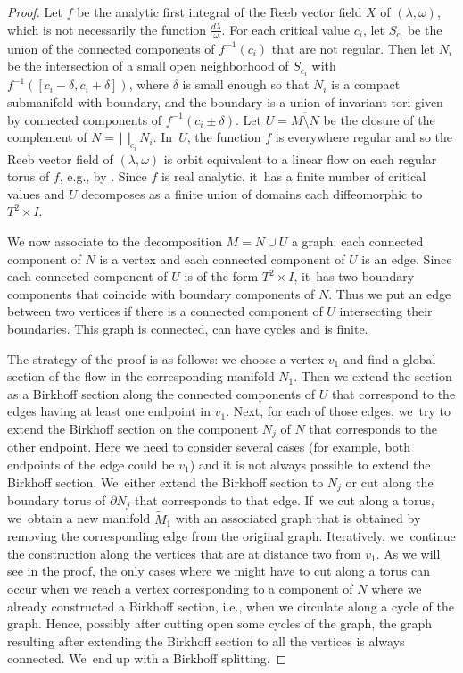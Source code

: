 \documentclass[11pt]{article}
\newcommand{\ie}{i.e.,\xspace}
\newcommand{\eg}{e.g.,\xspace}
\theoremstyle{definition}
\begin{document}
\begin{proof}
Let $f$ be the analytic first integral of the Reeb vector field $X$ of $(\lambda, \omega)$, which is not necessarily the function $\frac{d\lambda}{\omega}$. For each critical value $c_i$, let $S_{c_i}$ be the union of the connected components of $f^{-1}(c_i)$ that are not regular. Then let $N_i$ be the intersection of a small open neighborhood of $S_{c_i}$ with $f^{-1}([c_i-\delta,c_i+\delta])$, where $\delta$ is small enough so that $N_i$ is a compact submanifold with boundary, and the boundary is a union of invariant tori given by connected components of $f^{-1}(c_i \pm \delta)$. Let $U=\overline{M\setminus N}$ be the closure of the complement of $N=\bigsqcup_{c_i}N_i$. In~$U$, the function $f$ is everywhere regular and so the Reeb vector field of $(\lambda,\omega)$ is orbit equivalent to a linear flow on each regular torus of $f$, \eg by \cite[Th.\,3.3]{CV1}. Since $f$ is real analytic, it~has a finite number of critical values and $U$ decomposes as a finite union of domains each diffeomorphic to $T^2\times I$.

We now associate to the decomposition $M=N\cup U$ a graph: each connected component of $N$ is a vertex and each connected component of $U$ is an edge. Since each connected component of $U$ is of the form $T^2\times I$, it~has two boundary components that coincide with boundary components of $N$. Thus we put an edge between two vertices if there is a connected component of $U$ intersecting their boundaries. This graph is connected, can have cycles and is finite.

The strategy of the proof is as follows: we choose a vertex $v_1$ and find a global section of the flow in the corresponding manifold $N_1$. Then we extend the section as a Birkhoff section along the connected components of $U$ that correspond to the edges having at least one endpoint in $v_1$. Next, for each of those edges, we~try to extend the Birkhoff section on the component $N_j$ of $N$ that corresponds to the other endpoint. Here we need to consider several cases (for example, both endpoints of the edge could be $v_1$) and it is not always possible to extend the Birkhoff section. We~either extend the Birkhoff section to $N_j$ or cut along the boundary torus of $\partial N_j$ that corresponds to that edge. If~we cut along a torus, we~obtain a new manifold $\widetilde M_1$ with an associated graph that is obtained by removing the corresponding edge from the original graph. Iteratively, we~continue the construction along the vertices that are at distance two from $v_1$. As we will see in the proof, the only cases where we might have to cut along a torus can occur when we reach a vertex corresponding to a component of $N$ where we already constructed a Birkhoff section, \ie when we circulate along a cycle of the graph. Hence, possibly after cutting open some cycles of the graph, the graph resulting after extending the Birkhoff section to all the vertices is always connected. We~end up with a Birkhoff splitting.


\end{proof}
\end{document}
